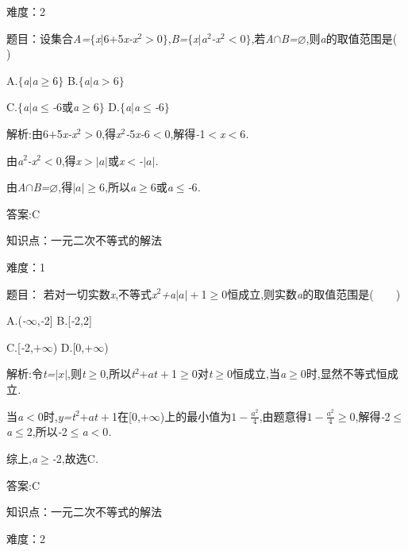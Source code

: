 \documentclass{article} %
\begin{document}
难度：2

 题目：设集合\textit{A=}$\mathrm{\{}$\textit{x$ |$}6\textit{$+$}5\textit{x-x}${}^{2}$\textit{$>$}0$\mathrm{\}}$,\textit{B=}$\mathrm{\{}$\textit{x$ |$a}${}^{2}$\textit{-x}${}^{2}$\textit{$<$}0$\mathrm{\}}$,若\textit{A}$\mathrm{\cap}$\textit{B=}$\mathrm{\varnothing }$,则\textit{a}的取值范围是(\textit{　　})

 A.$\mathrm{\{}$\textit{a$ |$a}$\mathrm{\ge}$6$\mathrm{\}}$ B.$\mathrm{\{}$\textit{a$ |$a$>$}6$\mathrm{\}}$

 C.$\mathrm{\{}$\textit{a$ |$a}$\mathrm{\le}$\textit{-}6或\textit{a}$\mathrm{\ge}$6$\mathrm{\}}$ D.$\mathrm{\{}$\textit{a$ |$a}$\mathrm{\le}$\textit{-}6$\mathrm{\}}$

 解析:由6\textit{$+$}5\textit{x-x}${}^{2}$\textit{$>$}0,得\textit{x}${}^{2}$\textit{-}5\textit{x-}6\textit{$<$}0,解得\textit{-}1\textit{$<$x$<$}6\textit{.}

由\textit{a}${}^{2}$\textit{-x}${}^{2}$\textit{$<$}0,得\textit{x$>$$|a|$}或\textit{x$<$-$|a|$.}

由\textit{A}$\mathrm{\cap}$\textit{B=}$\mathrm{\varnothing }$,得\textit{$|a|$}$\mathrm{\ge}$6,所以\textit{a}$\mathrm{\ge}$6或\textit{a}$\mathrm{\le}$\textit{-}6\textit{.}

 答案:C

知识点：一元二次不等式的解法

难度：1

 题目： 若对一切实数\textit{x},不等式\textit{x}${}^{2}$\textit{+a$|a|+$}1$\mathrm{\ge}$0恒成立,则实数\textit{a}的取值范围是(\textit{　　})

 A.(\textit{-$\infty$},\textit{-}2] B.[\textit{-}2,2]

 C.[\textit{-}2,\textit{$+\infty$}) D.[0,\textit{$+\infty$})

 解析:令\textit{t={$|x|$}},则\textit{t}$\mathrm{\ge}$0,所以\textit{t}${}^{2}$\textit{$+at+$}1$\mathrm{\ge}$0对\textit{t}$\mathrm{\ge}$0恒成立,当\textit{a}$\mathrm{\ge}$0时,显然不等式恒成立\textit{.}

当\textit{a$<$}0时,\textit{y=t}${}^{2}$\textit{$+at+$}1在[0,\textit{$+\infty$})上的最小值为$ 1-\frac{a^2}{4}$,由题意得$ 1-\frac{a^2}{4}\ge 0$,解得\textit{-}2$\mathrm{\le}$\textit{a}$\mathrm{\le}$2,所以\textit{-}2$\mathrm{\le}$\textit{a$<$}0\textit{.}

综上,\textit{a}$\mathrm{\ge}$\textit{-}2,故选C\textit{.}

 答案:C

知识点：一元二次不等式的解法

难度：2
\end{document}

